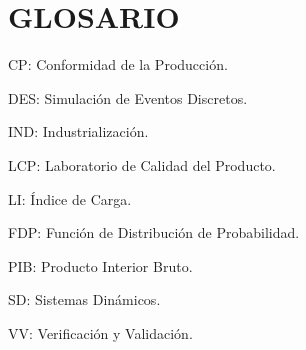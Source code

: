 \section{GLOSARIO}

CP: Conformidad de la Producción.

DES: Simulación de Eventos Discretos.

IND: Industrialización.

LCP: Laboratorio de Calidad del Producto.

LI: Índice de Carga.

FDP: Función de Distribución de Probabilidad.

PIB: Producto Interior Bruto.

SD: Sistemas Dinámicos.

VV: Verificación y Validación.
